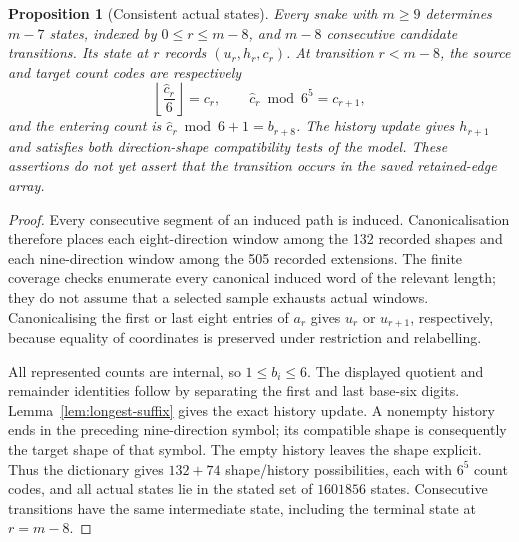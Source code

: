 \documentclass[11pt,a4paper]{article}
\newtheorem{proposition}[theorem]{Proposition}
\theoremstyle{definition}
\theoremstyle{remark}
\begin{document}
\begin{proposition}[Consistent actual states]\label{prop:actual-state-sequence}
Every snake with $m\ge9$ determines $m-7$ states, indexed by
$0\le r\le m-8$, and $m-8$ consecutive candidate transitions. Its state at
$r$ records $(u_r,h_r,c_r)$. At transition $r<m-8$, the source and target
count codes are respectively
\[
\left\lfloor\frac{\widehat c_r}{6}\right\rfloor=c_r,
\qquad \widehat c_r\bmod6^5=c_{r+1},
\]
and the entering count is $\widehat c_r\bmod6+1=b_{r+8}$.
The history update gives $h_{r+1}$ and satisfies both direction-shape
compatibility tests of the model. These assertions do not yet assert that
the transition occurs in the saved retained-edge array.
\end{proposition}
\begin{proof}
Every consecutive segment of an induced path is induced. Canonicalisation
therefore places each eight-direction window among the 132 recorded shapes
and each nine-direction window among the 505 recorded extensions. The finite
coverage checks enumerate every canonical induced word of the relevant
length; they do not assume that a selected sample exhausts actual windows.
Canonicalising the first or last eight entries of $a_r$ gives $u_r$ or
$u_{r+1}$, respectively, because equality of coordinates is preserved under
restriction and relabelling.

All represented counts are internal, so $1\le b_i\le6$. The displayed
quotient and remainder identities follow by separating the first and last
base-six digits. Lemma~\ref{lem:longest-suffix} gives the exact history
update. A nonempty history ends in the preceding nine-direction symbol;
its compatible shape is consequently the target shape of that symbol.
The empty history leaves the shape explicit. Thus the dictionary gives
$132+74$ shape/history possibilities, each with $6^5$ count codes, and all
actual states lie in the stated set of $1601856$ states. Consecutive
transitions have the same intermediate state, including the terminal state
at $r=m-8$.
\end{proof}
\end{document}
